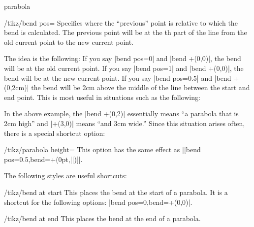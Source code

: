 \begin{pathoperation}{parabola}{}
\begin{key}{/tikz/bend pos=}
  Specifies where the ``previous'' point is relative to which the bend
  is calculated. The previous point will be at the th
  part of the line from the old current point to the new current
  point.

  The idea is the following: If you say |bend pos=0| and
  |bend +(0,0)|, the bend will be at the old current point. If you say
  |bend pos=1| and |bend +(0,0)|, the bend will be at the new current
  point. If you say |bend pos=0.5| and |bend +(0,2cm)| the bend will
  be 2cm above the middle of the line between the start and end
  point. This is most useful in situations such as the following:
\begin{codeexample}[]
\end{codeexample}

  In the above example, the |bend +(0,2)| essentially means ``a
  parabola that is 2cm high'' and |+(3,0)| means ``and 3cm wide.''
  Since this situation arises often, there is a special shortcut
  option:
  \begin{key}{/tikz/parabola height=}
    This option has the same effect as
    |[bend pos=0.5,bend={+(0pt,||)}]|.
\begin{codeexample}[]
\end{codeexample}
  \end{key}
\end{key}

The following styles are useful shortcuts:
\begin{stylekey}{/tikz/bend at start}
  This places the bend at the start of a
  parabola. It is a shortcut for the following options:
  |bend pos=0,bend={+(0,0)}|.
\end{stylekey}

\begin{stylekey}{/tikz/bend at end}
  This places the bend at the end of a parabola.
\end{stylekey}

\end{pathoperation}


